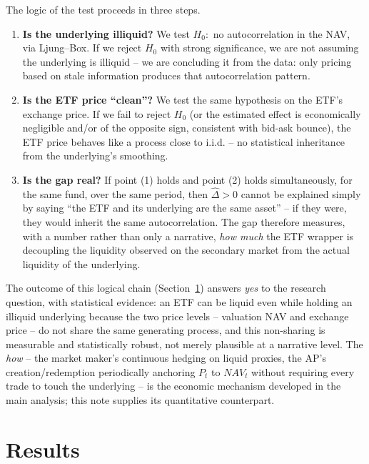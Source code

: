 \documentclass[11pt]{article}
\begin{document}
The logic of the test proceeds in three steps.

\begin{enumerate}
\item \textbf{Is the underlying illiquid?} We test $H_0:$ no autocorrelation in the NAV, via Ljung--Box. If we reject $H_0$ with strong significance, we are not assuming the underlying is illiquid -- we are concluding it from the data: only pricing based on stale information produces that autocorrelation pattern.
\item \textbf{Is the ETF price ``clean''?} We test the same hypothesis on the ETF's exchange price. If we fail to reject $H_0$ (or the estimated effect is economically negligible and/or of the opposite sign, consistent with bid-ask bounce), the ETF price behaves like a process close to i.i.d. -- no statistical inheritance from the underlying's smoothing.
\item \textbf{Is the gap real?} If point (1) holds and point (2) holds simultaneously, for the same fund, over the same period, then $\widehat{\Delta} > 0$ cannot be explained simply by saying ``the ETF and its underlying are the same asset'' -- if they were, they would inherit the same autocorrelation. The gap therefore measures, with a number rather than only a narrative, \emph{how much} the ETF wrapper is decoupling the liquidity observed on the secondary market from the actual liquidity of the underlying.
\end{enumerate}

The outcome of this logical chain (Section~\ref{sec:results}) answers \emph{yes} to the research question, with statistical evidence: an ETF can be liquid even while holding an illiquid underlying because the two price levels -- valuation NAV and exchange price -- do not share the same generating process, and this non-sharing is measurable and statistically robust, not merely plausible at a narrative level. The \emph{how} -- the market maker's continuous hedging on liquid proxies, the AP's creation/redemption periodically anchoring $P_t$ to $NAV_t$ without requiring every trade to touch the underlying -- is the economic mechanism developed in the main analysis; this note supplies its quantitative counterpart.

\section{Results}
\label{sec:results}
\end{document}
